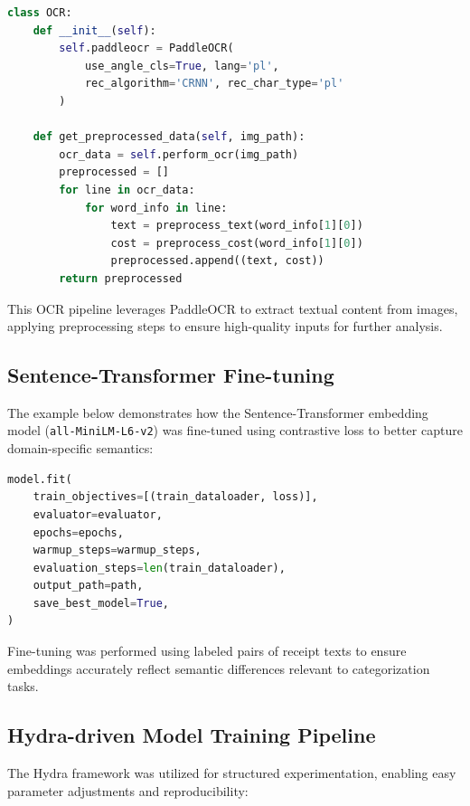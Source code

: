 \documentclass{SGGW-thesis-EN}
\begin{document}
\begin{lstlisting}[language=Python, caption={OCR class}, label={lst:ocr}]
class OCR:
    def __init__(self):
        self.paddleocr = PaddleOCR(
            use_angle_cls=True, lang='pl',
            rec_algorithm='CRNN', rec_char_type='pl'
        )

    def get_preprocessed_data(self, img_path):
        ocr_data = self.perform_ocr(img_path)
        preprocessed = []
        for line in ocr_data:
            for word_info in line:
                text = preprocess_text(word_info[1][0])
                cost = preprocess_cost(word_info[1][0])
                preprocessed.append((text, cost))
        return preprocessed
\end{lstlisting}
\label{code:ocr_pipeline_example}
\noindent This OCR pipeline leverages PaddleOCR to extract textual content from images, applying preprocessing steps to ensure high-quality inputs for further analysis.

\subsection{Sentence-Transformer Fine-tuning}

The example below demonstrates how the Sentence-Transformer embedding model (\texttt{all-MiniLM-L6-v2}) was fine-tuned using contrastive loss to better capture domain-specific semantics:

\begin{lstlisting}[language=Python, caption={Fine-tuning Sentence-Transformer embeddings}, label={lst:embedding_finetuning}]
model.fit(
    train_objectives=[(train_dataloader, loss)],
    evaluator=evaluator,
    epochs=epochs,
    warmup_steps=warmup_steps,
    evaluation_steps=len(train_dataloader),
    output_path=path,
    save_best_model=True,
)
\end{lstlisting}
\label{code:finetuning_example}
\noindent Fine-tuning was performed using labeled pairs of receipt texts to ensure embeddings accurately reflect semantic differences relevant to categorization tasks.

\subsection{Hydra-driven Model Training Pipeline}

The Hydra framework was utilized for structured experimentation, enabling easy parameter adjustments and reproducibility:
\end{document}
